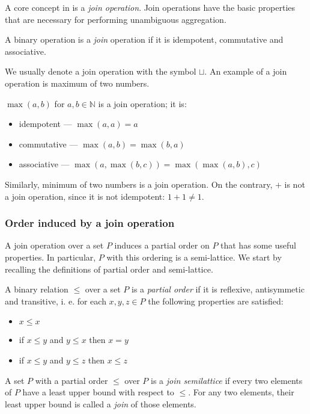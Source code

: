 A core concept in \datalogra is a \emph{join operation}. Join operations have the basic properties that are necessary for performing unambiguous aggregation.

\begin{defn}
A binary operation is a \emph{join} operation if it is idempotent, commutative and associative. 
\end{defn}

We usually denote a join operation with the symbol $\sqcup$.
An example of a join operation is maximum of two numbers.

\begin{exmp}
$\max(a, b)$ for $a, b \in \mathbb{N}$ is a join operation; it is:
\begin{itemize}
\item idempotent --- $\max(a, a) = a$
\item commutative --- $\max(a, b) = \max(b, a)$
\item associative --- $\max(a, \max(b, c)) = \max(\max(a, b), c)$
\end{itemize}

Similarly, minimum of two numbers is a join operation. On the contrary, $+$ is not a join operation, since it is not idempotent: $1+1 \ne 1$.
\end{exmp}

\subsubsection{Order induced by a join operation}

A join operation over a set $P$ induces a partial order on $P$ that has some useful properties. In particular, $P$ with this ordering is a semi-lattice. We start by recalling the definitions of partial order and semi-lattice.

\begin{defn}
A binary relation $\le$ over a set $P$ is a \emph{partial order} if it is reflexive, antisymmetic and transitive, i. e. for each $x, y, z \in P$ the following properties are satisfied:
\begin{itemize}
\item $x \le x$
\item if $x \le y$ and $y \le x$ then $x = y$
\item if $x \le y$ and $y \le z$ then $x \le z$
\end{itemize}
\end{defn}

\begin{defn}
A set $P$ with a partial order $\le$ over $P$ is a \emph{join semilattice} if every two elements of $P$ have a least upper bound with respect to $\le$. For any two elements, their least upper bound is called a \emph{join} of those elements.
\end{defn}

